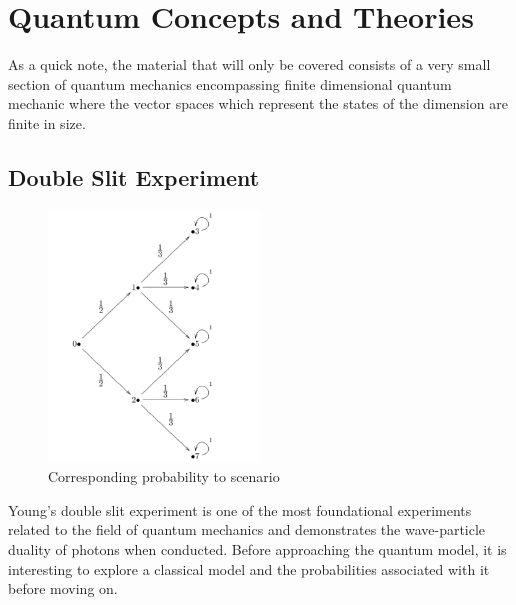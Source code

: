 \documentclass[12pt]{article}
\begin{document}
\section{Quantum Concepts and Theories}

As a quick note, the material that will only be covered consists of a very small section of quantum mechanics encompassing finite dimensional quantum mechanic where the vector spaces which represent the states of the dimension are finite in size.\par

\subsection{Double Slit Experiment}
\begin{figure}
  \centering
  \includegraphics[width=0.5\textwidth]{classicslit}
  \caption{Corresponding probability to scenario}
\end{figure}
Young's double slit experiment is one of the most foundational experiments related to the field of quantum mechanics and demonstrates the wave-particle duality of photons when conducted. Before approaching the quantum model, it is interesting to explore a classical model and the probabilities associated with it before moving on.\par
\end{document}
